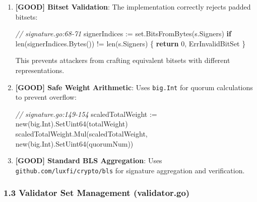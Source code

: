 \documentclass[
]{article}
\newenvironment{Shaded}{}{}
\newcommand{\BuiltInTok}[1]{\textcolor[rgb]{0.00,0.50,0.00}{#1}}
\newcommand{\CommentTok}[1]{\textcolor[rgb]{0.38,0.63,0.69}{\textit{#1}}}
\newcommand{\ControlFlowTok}[1]{\textcolor[rgb]{0.00,0.44,0.13}{\textbf{#1}}}
\newcommand{\DecValTok}[1]{\textcolor[rgb]{0.25,0.63,0.44}{#1}}
\newcommand{\NormalTok}[1]{#1}
\newcommand{\OperatorTok}[1]{\textcolor[rgb]{0.40,0.40,0.40}{#1}}
\begin{document}
\begin{enumerate}
\def\labelenumi{\arabic{enumi}.}
\item
  \textbf{{[}GOOD{]} Bitset Validation}: The implementation correctly
  rejects padded bitsets:

\begin{Shaded}
\begin{Highlighting}[]
\CommentTok{// signature.go:68{-}71}
\NormalTok{signerIndices }\OperatorTok{:=}\NormalTok{ set}\OperatorTok{.}\NormalTok{BitsFromBytes}\OperatorTok{(}\NormalTok{s}\OperatorTok{.}\NormalTok{Signers}\OperatorTok{)}
\ControlFlowTok{if} \BuiltInTok{len}\OperatorTok{(}\NormalTok{signerIndices}\OperatorTok{.}\NormalTok{Bytes}\OperatorTok{())} \OperatorTok{!=} \BuiltInTok{len}\OperatorTok{(}\NormalTok{s}\OperatorTok{.}\NormalTok{Signers}\OperatorTok{)} \OperatorTok{\{}
    \ControlFlowTok{return} \DecValTok{0}\OperatorTok{,}\NormalTok{ ErrInvalidBitSet}
\OperatorTok{\}}
\end{Highlighting}
\end{Shaded}

  This prevents attackers from crafting equivalent bitsets with
  different representations.
\item
  \textbf{{[}GOOD{]} Safe Weight Arithmetic}: Uses \texttt{big.Int} for
  quorum calculations to prevent overflow:

\begin{Shaded}
\begin{Highlighting}[]
\CommentTok{// signature.go:149{-}154}
\NormalTok{scaledTotalWeight }\OperatorTok{:=} \BuiltInTok{new}\OperatorTok{(}\NormalTok{big}\OperatorTok{.}\NormalTok{Int}\OperatorTok{).}\NormalTok{SetUint64}\OperatorTok{(}\NormalTok{totalWeight}\OperatorTok{)}
\NormalTok{scaledTotalWeight}\OperatorTok{.}\NormalTok{Mul}\OperatorTok{(}\NormalTok{scaledTotalWeight}\OperatorTok{,} \BuiltInTok{new}\OperatorTok{(}\NormalTok{big}\OperatorTok{.}\NormalTok{Int}\OperatorTok{).}\NormalTok{SetUint64}\OperatorTok{(}\NormalTok{quorumNum}\OperatorTok{))}
\end{Highlighting}
\end{Shaded}
\item
  \textbf{{[}GOOD{]} Standard BLS Aggregation}: Uses
  \texttt{github.com/luxfi/crypto/bls} for signature aggregation and
  verification.
\end{enumerate}

\subsubsection{1.3 Validator Set Management
(validator.go)}\label{13-validator-set-management-validatorgo}
\end{document}
